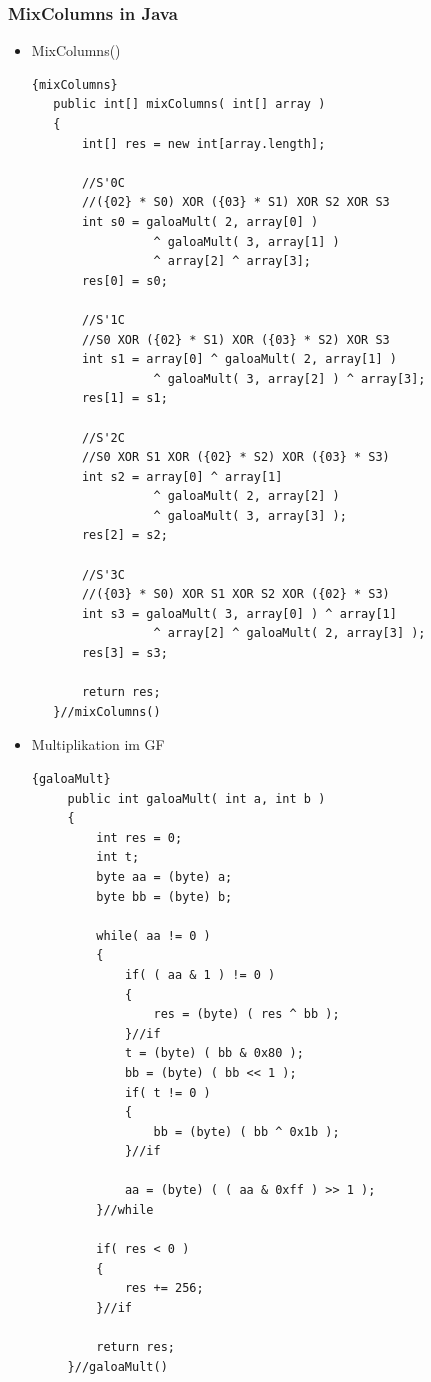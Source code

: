  \subsubsection{MixColumns in Java}
 \begin{itemize}
     \item MixColumns()
     \begin{lstlisting}[caption=mixColumns]{mixColumns}
   public int[] mixColumns( int[] array )
   {
       int[] res = new int[array.length];

       //S'0C
       //({02} * S0) XOR ({03} * S1) XOR S2 XOR S3
       int s0 = galoaMult( 2, array[0] )
                 ^ galoaMult( 3, array[1] )
                 ^ array[2] ^ array[3];
       res[0] = s0;

       //S'1C
       //S0 XOR ({02} * S1) XOR ({03} * S2) XOR S3
       int s1 = array[0] ^ galoaMult( 2, array[1] )
                 ^ galoaMult( 3, array[2] ) ^ array[3];
       res[1] = s1;

       //S'2C
       //S0 XOR S1 XOR ({02} * S2) XOR ({03} * S3)
       int s2 = array[0] ^ array[1]
                 ^ galoaMult( 2, array[2] )
                 ^ galoaMult( 3, array[3] );
       res[2] = s2;

       //S'3C
       //({03} * S0) XOR S1 XOR S2 XOR ({02} * S3)
       int s3 = galoaMult( 3, array[0] ) ^ array[1]
                 ^ array[2] ^ galoaMult( 2, array[3] );
       res[3] = s3;

       return res;
   }//mixColumns()
 \end{lstlisting}
     \item Multiplikation im GF
     \begin{lstlisting}[caption=galoaMult]{galoaMult}
     public int galoaMult( int a, int b )
     {
         int res = 0;
         int t;
         byte aa = (byte) a;
         byte bb = (byte) b;

         while( aa != 0 )
         {
             if( ( aa & 1 ) != 0 )
             {
                 res = (byte) ( res ^ bb );
             }//if
             t = (byte) ( bb & 0x80 );
             bb = (byte) ( bb << 1 );
             if( t != 0 )
             {
                 bb = (byte) ( bb ^ 0x1b );
             }//if

             aa = (byte) ( ( aa & 0xff ) >> 1 );
         }//while

         if( res < 0 )
         {
             res += 256;
         }//if

         return res;
     }//galoaMult()
     \end{lstlisting}

 \end{itemize}

